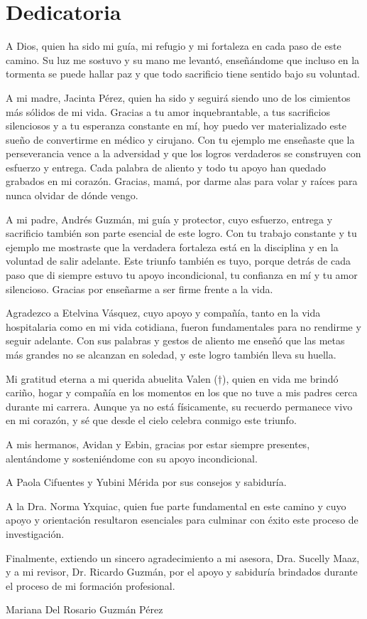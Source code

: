 \chapter*{Dedicatoria}

A Dios, quien ha sido mi guía, mi refugio y mi fortaleza en cada paso de este 
camino. Su luz me sostuvo y su mano me levantó, enseñándome que incluso en la 
tormenta se puede hallar paz y que todo sacrificio tiene sentido bajo su 
voluntad.

A mi madre, Jacinta Pérez, quien ha sido y seguirá siendo uno de los cimientos 
más sólidos de mi vida. Gracias a tu amor inquebrantable, a tus sacrificios 
silenciosos y a tu esperanza constante en mí, hoy puedo ver materializado este 
sueño de convertirme en médico y cirujano. Con tu ejemplo me enseñaste que la 
perseverancia vence a la adversidad y que los logros verdaderos se construyen 
con esfuerzo y entrega. Cada palabra de aliento y todo tu apoyo han quedado 
grabados en mi corazón. Gracias, mamá, por darme alas para volar y raíces 
para nunca olvidar de dónde vengo.

A mi padre, Andrés Guzmán, mi guía y protector, cuyo esfuerzo, entrega y 
sacrificio también son parte esencial de este logro. Con tu trabajo constante 
y tu ejemplo me mostraste que la verdadera fortaleza está en la disciplina y 
en la voluntad de salir adelante. Este triunfo también es tuyo, porque detrás 
de cada paso que di siempre estuvo tu apoyo incondicional, tu confianza en mí 
y tu amor silencioso. Gracias por enseñarme a ser firme frente a la vida.

Agradezco a Etelvina Vásquez, cuyo apoyo y compañía, tanto en la vida 
hospitalaria como en mi vida cotidiana, fueron fundamentales para no rendirme 
y seguir adelante. Con sus palabras y gestos de aliento me enseñó que las 
metas más grandes no se alcanzan en soledad, y este logro también lleva su 
huella.

Mi gratitud eterna a mi querida abuelita Valen ($\dagger$), quien en vida me 
brindó cariño, hogar y compañía en los momentos en los que no tuve a mis padres 
cerca durante mi carrera. Aunque ya no está físicamente, su recuerdo permanece 
vivo en mi corazón, y sé que desde el cielo celebra conmigo este triunfo.

A mis hermanos, Avidan y Esbin, gracias por estar siempre presentes, 
alentándome y sosteniéndome con su apoyo incondicional.

A Paola Cifuentes y Yubini Mérida por sus consejos y sabiduría.

A la Dra. Norma Yxquiac, quien fue parte fundamental en este camino y cuyo 
apoyo y orientación resultaron esenciales para culminar con éxito este proceso 
de investigación.

Finalmente, extiendo un sincero agradecimiento a mi asesora, Dra. Sucelly Maaz, 
y a mi revisor, Dr. Ricardo Guzmán, por el apoyo y sabiduría brindados durante 
el proceso de mi formación profesional.

\begin{flushright}
Mariana Del Rosario Guzmán Pérez
\end{flushright}
